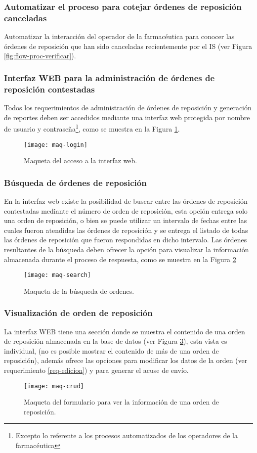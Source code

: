 \subsubsection{Automatizar el proceso para cotejar órdenes de reposición canceladas}
Automatizar la interacción del operador de la farmacéutica para conocer las órdenes de reposición que han sido canceladas recientemente por el IS (ver Figura \ref{fig:flow-proc-verificar}).

\subsubsection{Interfaz WEB para la administración de órdenes de reposición contestadas}
Todos los requerimientos de administración de órdenes de reposición y generación de reportes deben ser accedidos mediante una interfaz web protegida por nombre de usuario y contraseña\footnote{Excepto lo referente a los procesos automatizados de los operadores de la farmacéutica}, como se muestra en la Figura \ref{fig:maq-login}.
\begin{figure}[h]
  \centering
  \texttt{[image: maq-login]} 
  \caption{Maqueta del acceso a la interfaz web.}
  \label{fig:maq-login}
\end{figure} 

\subsubsection{Búsqueda de órdenes de reposición}
En la interfaz web existe la posibilidad de buscar entre las órdenes de reposición contestadas mediante el número de orden de reposición, esta opción entrega solo una orden de reposición, o bien se puede utilizar un intervalo de fechas entre las cuales fueron atendidas las órdenes de reposición y se entrega el listado de todas las órdenes de reposición que fueron respondidas en dicho intervalo. Las órdenes resultantes de la búsqueda deben ofrecer la opción para visualizar la información almacenada durante el proceso de respuesta, como se muestra en la Figura \ref{fig:maq-search}
\begin{figure}[h]
  \centering
  \texttt{[image: maq-search]} 
  \caption{Maqueta de la búsqueda de ordenes.}
  \label{fig:maq-search}
\end{figure} 

\subsubsection{Visualización de orden de reposición}
La interfaz WEB tiene una sección donde se muestra el contenido de una orden de reposición almacenada en la base de datos (ver Figura \ref{fig:maq-crud}), esta vista es individual, (no es posible mostrar el contenido de más de una orden de reposición), además ofrece las opciones para modificar los datos de la orden (ver requerimiento \ref{req-edicion}) y para generar el acuse de envío.
\begin{figure}[h]
  \centering
  \texttt{[image: maq-crud]} 
  \caption{Maqueta del formulario para ver la información de una orden de reposición.}
  \label{fig:maq-crud}
\end{figure} 

